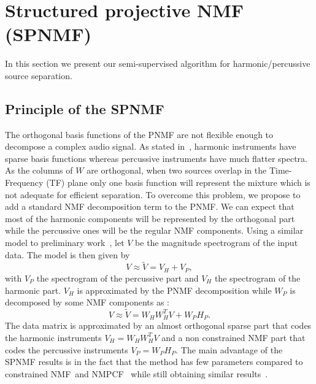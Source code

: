 \section{Structured projective NMF (SPNMF)}
\label{sec:SPNMF}

In this section we present our semi-supervised algorithm for harmonic/percussive source separation.

\subsection{Principle of the SPNMF}

The orthogonal basis functions of the PNMF are not flexible enough to decompose a complex audio signal. As stated in~\cite{canadas2014percussive}, harmonic instruments have sparse basis functions whereas percussive instruments have much flatter spectra. As the columns of $W$ are orthogonal, when two sources overlap in the Time-Frequency (TF) plane only one basis function will represent the mixture which is not adequate for efficient separation. To overcome this problem, we propose to add a standard NMF decomposition term to the PNMF. We can expect that most of the harmonic components will be represented by the orthogonal part while the percussive ones will be the regular NMF components. Using a similar model to preliminary work~\cite{laroche2015structured}, let $V$ be the magnitude spectrogram of the input data. The model is then given by
\begin{equation} \label{Cfunction}
V \approx \tilde{V}= V_H + V_{P},
\end{equation}
with $V_P$ the spectrogram of the percussive part and $V_H$ the spectrogram of the harmonic part. $V_H$ is approximated by the PNMF decomposition while $W_P$ is decomposed by some NMF components as :
\begin{equation}
V \approx \tilde{V}= W_{H}W_{H}^{T}V + W_{P} H_{P}.
\end{equation}
The data matrix is approximated by an almost orthogonal sparse part that codes the harmonic instruments $V_H = W_HW_H^T V$ and a non constrained NMF part that codes the percussive instruments $V_P = W_PH_P$. The main advantage of the SPNMF results is in the fact that the method has few parameters compared to constrained NMF~\cite{canadas2014percussive}and NMPCF~\cite{kim2011nonnegative} while still obtaining similar results~\cite{laroche2015structured}. 





